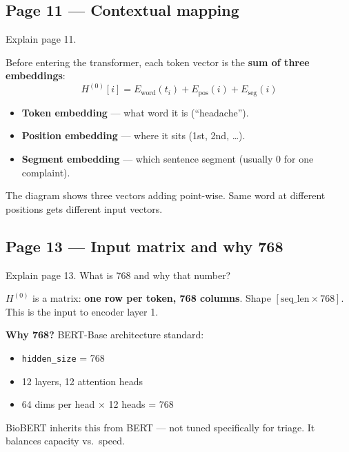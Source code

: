 \documentclass[11pt]{article}
\begin{document}
\subsection{Page 11 --- Contextual mapping}

\begin{questionbox}
Explain page 11.
\end{questionbox}

\begin{answerbox}
Before entering the transformer, each token vector is the \textbf{sum of three embeddings}:
\[
H^{(0)}[i] = E_{\mathrm{word}}(t_i) + E_{\mathrm{pos}}(i) + E_{\mathrm{seg}}(i)
\]
\begin{itemize}
  \item \textbf{Token embedding} --- what word it is (``headache'').
  \item \textbf{Position embedding} --- where it sits (1st, 2nd, \ldots).
  \item \textbf{Segment embedding} --- which sentence segment (usually 0 for one complaint).
\end{itemize}
The diagram shows three vectors adding point-wise. Same word at different positions gets different input vectors.
\end{answerbox}

\subsection{Page 13 --- Input matrix and why 768}

\begin{questionbox}
Explain page 13. What is 768 and why that number?
\end{questionbox}

\begin{answerbox}
$H^{(0)}$ is a matrix: \textbf{one row per token, 768 columns}. Shape $[\text{seq\_len} \times 768]$. This is the input to encoder layer 1.

\textbf{Why 768?} BERT-Base architecture standard:
\begin{itemize}
  \item \texttt{hidden\_size} = 768
  \item 12 layers, 12 attention heads
  \item 64 dims per head $\times$ 12 heads = 768
\end{itemize}
BioBERT inherits this from BERT --- not tuned specifically for triage. It balances capacity vs.\ speed.
\end{answerbox}
\end{document}
